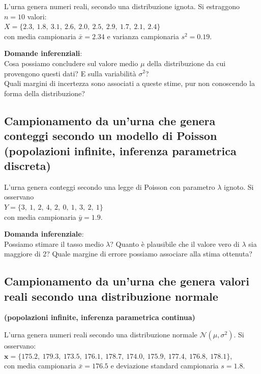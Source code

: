 \documentclass[
  11pt,
]{book}
\theoremstyle{mytheoremstyle}
\theoremstyle{mydefstyle}
\begin{document}
L'urna genera numeri reali, secondo una distribuzione ignota. Si estraggono \(n = 10\) valori:\\
\(X = \{2.3,\ 1.8,\ 3.1,\ 2.6,\ 2.0,\ 2.5,\ 2.9,\ 1.7,\ 2.1,\ 2.4\}\)\\
con media campionaria \(\bar{x} = 2.34\) e varianza campionaria \(s^2 = 0.19\).

\textbf{Domande inferenziali}:\\
Cosa possiamo concludere sul valore medio \(\mu\) della distribuzione da cui provengono questi dati? E sulla variabilità \(\sigma^2\)?\\
Quali margini di incertezza sono associati a queste stime, pur non conoscendo la forma della distribuzione?

\subsection{\texorpdfstring{Campionamento da un'urna che genera conteggi secondo un modello di Poisson \textbf{(popolazioni infinite, inferenza parametrica discreta)}}{Campionamento da un'urna che genera conteggi secondo un modello di Poisson (popolazioni infinite, inferenza parametrica discreta)}}\label{campionamento-da-unurna-che-genera-conteggi-secondo-un-modello-di-poisson-popolazioni-infinite-inferenza-parametrica-discreta}

L'urna genera conteggi secondo una legge di Poisson con parametro \(\lambda\) ignoto. Si osservano\\
\(Y = \{3,\ 1,\ 2,\ 4,\ 2,\ 0,\ 1,\ 3,\ 2,\ 1\}\)\\
con media campionaria \(\bar{y} = 1.9\).

\textbf{Domanda inferenziale}:\\
Possiamo stimare il tasso medio \(\lambda\)? Quanto è plausibile che il valore vero di \(\lambda\) sia maggiore di 2? Quale margine di errore possiamo associare alla stima ottenuta?

\subsection{Campionamento da un'urna che genera valori reali secondo una distribuzione normale}\label{campionamento-da-unurna-che-genera-valori-reali-secondo-una-distribuzione-normale}

\textbf{(popolazioni infinite, inferenza parametrica continua)}

L'urna genera numeri reali secondo una distribuzione normale \(\mathcal{N}(\mu, \sigma^2)\). Si osservano:\\
\(\mathbf{x} = \{175.2,\ 179.3,\ 173.5,\ 176.1,\ 178.7,\ 174.0,\ 175.9,\ 177.4,\ 176.8,\ 178.1\}\),\\
con media campionaria \(\bar{x} = 176.5\) e deviazione standard campionaria \(s = 1.8\).
\end{document}
